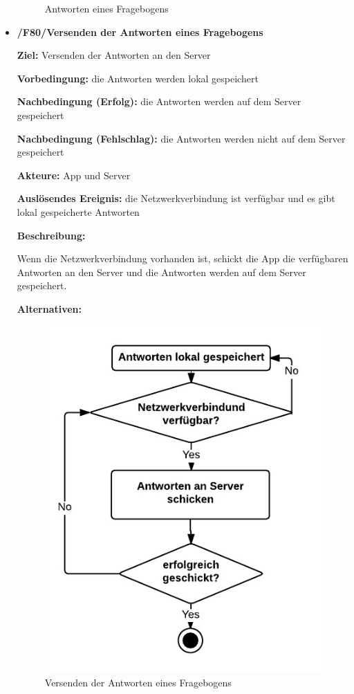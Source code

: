 \documentclass[a4paper]{scrreprt}
\begin{document}
\begin{itemize}
\begin{figure}[ht]
            		\caption{Antworten eines Fragebogens}
            	\end{figure}
            	

            \item \textbf{/F80/Versenden der Antworten eines Fragebogens}

            \par \textbf{Ziel: }Versenden der Antworten an den Server
            \par \textbf{Vorbedingung: }die Antworten werden lokal gespeichert
            \par \textbf{Nachbedingung (Erfolg): }die Antworten werden auf dem Server gespeichert
            \par \textbf{Nachbedingung (Fehlschlag): }die Antworten werden nicht auf dem Server gespeichert
            \par \textbf{Akteure: }App und Server
            \par \textbf{Auslösendes Ereignis: }die Netzwerkverbindung ist verfügbar und es gibt lokal gespeicherte Antworten
            \par \textbf{Beschreibung: }
            \par Wenn die Netzwerkverbindung vorhanden ist, schickt die App die verfügbaren Antworten an den Server und die Antworten werden auf dem Server gespeichert.
            \par \textbf{Alternativen: }
            \begin{figure}[ht]
            	\centering
            	\includegraphics[scale=1.2]{AppVersenden.jpeg}
            	\caption{Versenden der Antworten eines Fragebogens}
            \end{figure}



\end{itemize}
\end{document}
